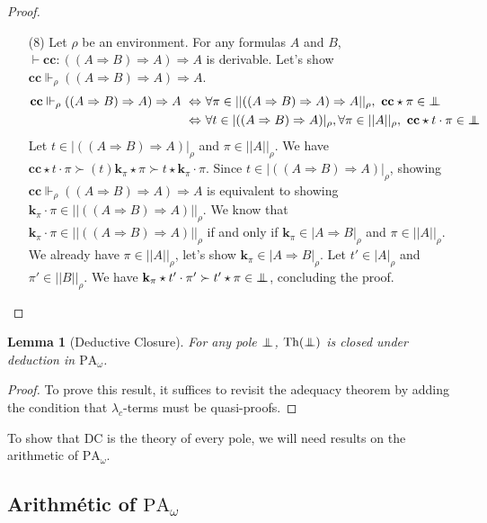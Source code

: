 \documentclass[a4paper,12pt]{article}
\newtheorem{lem}[theo]{Lemma}
\theoremstyle{rmqstyle}
\newcommand{\abs}[1]{\lvert#1\rvert}
\newcommand{\abss}[1]{\lvert \lvert#1\rvert \rvert}
\newcommand{\PA}{\mathrm{PA}}
\renewcommand{\implies}{\Rightarrow}
\renewcommand{\iff}{\Leftrightarrow}
\newcommand{\cc}{\mathbf{cc}}
\renewcommand{\k}{\mathbf{k}}
\newcommand{\pole}{{\protect\mathpalette{\protect\polehelper}{\bot}}} \def\polehelper#1#2{\mathrel{\rlap{$#1#2$}\mkern3mu{#1#2}}}
\newcommand{\Th}{\mathrm{Th}}
\newcommand{\DC}{\mathrm{DC}}
\begin{document}
\begin{proof}
\begin{itemize}
\item[(8)] Let $\rho$ be an environment. For any formulas $A$ and $B$, $\vdash \cc : ((A \implies B) \implies A) \implies A$ is derivable. Let's show $\cc \Vdash_\rho ((A \implies B) \implies A) \implies A$.
\begin{align*}
\cc \Vdash_\rho ((A \implies B) \implies A) \implies A \ \iff& \ \forall \pi \in \abss{((A \implies B) \implies A) \implies A}_\rho, \ \cc \star \pi \in \pole\\
\iff& \ \forall t \in \abs{((A \implies B) \implies A)}_\rho, \forall \pi \in \abss{A}_\rho, \ \cc \star t \cdot \pi \in \pole
\end{align*}
Let $t \in \abs{((A \implies B) \implies A)}_\rho$ and $\pi \in \abss{A}_\rho$. We have $ \cc \star t \cdot \pi \succ (t)\k_\pi \star \pi \succ t \star \k_\pi \cdot \pi$. Since $t \in \abs{((A \implies B) \implies A)}_\rho$, showing $\cc \Vdash_\rho ((A \implies B) \implies A) \implies A$ is equivalent to showing $\k_\pi \cdot \pi \in \abss{((A \implies B) \implies A)}_\rho$. We know that $\k_\pi \cdot \pi \in \abss{((A \implies B) \implies A)}_\rho$ if and only if $\k_\pi \in \abs{A \implies B}_\rho$ and $\pi \in \abss{A}_\rho$. We already have $\pi \in \abss{A}_\rho$, let's show $\k_\pi \in \abs{A \implies B}_\rho$. Let $t' \in \abs{A}_\rho$ and $\pi' \in \abss{B}_\rho$. We have $\k_\pi \star t' \cdot \pi' \succ t' \star \pi \in \pole$, concluding the proof.
\end{itemize}
\end{proof}

\begin{lem}[Deductive Closure]
\label{cloture}
For any pole $\pole$, $\Th(\pole)$ is closed under deduction in $\PA_\omega$.
\end{lem}

\begin{proof}
To prove this result, it suffices to revisit the adequacy theorem by adding the condition that $\lambda_c$-terms must be quasi-proofs.
\end{proof}

To show that $\DC$ is the theory of every pole, we will need results on the arithmetic of $\PA_\omega$.

\clearpage
\subsection{Arithmétic of \( \PA_\omega \)}
\label{arithmetique de PA}
\end{document}
